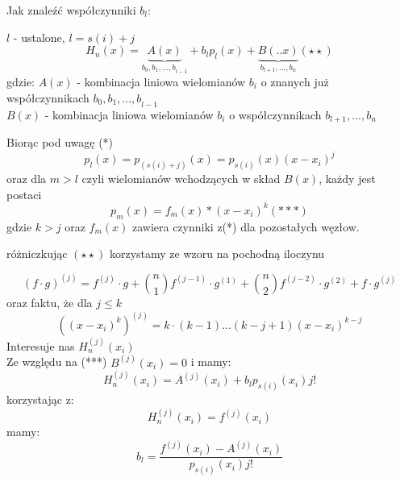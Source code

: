 \begin{frame}
Jak znaleźć współczynniki $b_{l}$:

$l$ - ustalone, $l=s(i)+j$
$$
H_{n}(x)=\underbrace{A(x)}_{b_{0},{b_{1},\ldots,b}_{l-1}}+b_{l}p_{l}(x)+\underbrace{B(..x)}_{b_{l+1},\ldots,b_{n}}(\star\star)
$$
gdzie:
$A(x)$ - kombinacja liniowa wielomianów $b_i$ o znanych już współczynnikach $b_{0},{b_{1},\ldots,b}_{l-1}$\\

\vspace{3mm}
$B(x)$ - kombinacja liniowa wielomianów $b_i$ o współczynnikach $b_{l+1},\ldots,b_{n}$
\end{frame}
\begin{frame}
Biorąc pod uwagę (*)
$$
p_{l}(x)=p_{(s(i)+j)}(x)=p_{s(i)}(x)(x-x_{i})^{j}
$$
oraz dla $m > l$ czyli wielomianów wchodzących w skład $B(x)$, każdy jest postaci
$$
p_{m}(x)=f_m(x)*(x-x_{i})^{k}(***)
$$
gdzie $k>j$ oraz $f_m(x)$ zawiera czynniki z(*) dla pozostałych węzłow. \\
\end{frame}
\begin{frame}
różniczkując $(\star\star)$ korzystamy ze wzoru na pochodną iloczynu 

$$
(f\cdot g)^{(j)}=f^{(j)}\cdot g+ {n\choose 1} f^{(j-1)}\cdot g^{(1)}+{n\choose 2} f^{(j-2)}\cdot g^{(2)}+f\cdot g^{(j)}
$$
oraz faktu, że dla $j\leq k$
$$
((x-x_i)^{k})^{(j)}=k\cdot (k-1) ...(k-j+1)(x-x_i)^{k-j}
$$
Interesuje nas $H_{n}^{(j)}(x_{i})$\\
Ze względu na (***) $B^{(j)}(x_i)=0$ i mamy:
$$
H_{n}^{(j)}(x_{i})=A^{(j)}(x_{i})+b_{l}p_{s(i)}(x_{i})j!
$$
korzystając $\mathrm{z}$:
$$
H_{n}^{(j)}(x_{i})=f^{(j)}(x_{i})
$$
mamy:
$$
b_{l}=\frac{f^{(j)}(x_{i})-A^{(j)}(x_{i})}{p_{s(i)}(x_{i})j!}
$$

\end{frame}
